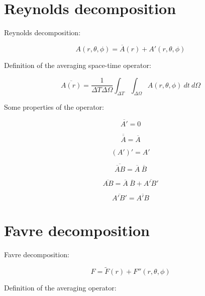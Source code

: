 \documentclass[10pt,paper=a4]{report}
\newcommand{\eht}{\overline}
\newcommand{\fht}{\widetilde}
\begin{document}
\section{Reynolds decomposition}

\noindent 
Reynolds decomposition:

\begin{equation}
A(r,\theta,\phi) = \eht{A}(r) + A'(r,\theta,\phi)
\end{equation}

\noindent
Definition of the averaging space-time operator:

\begin{equation}
\eht{A(r)} = \frac{1}{\Delta T \Delta \Omega} \int_{\Delta T}\int_{\Delta \Omega} A(r,
\theta,\phi) \ dt \ d\Omega
\end{equation}

\noindent
Some properties of the operator:

\begin{equation}
\eht{A'} = 0 
\end{equation}

\begin{equation}
\eht{\eht{A}}=\eht{A}
\end{equation}

\begin{equation}
(A')'=A'
\end{equation}

\begin{equation}
\eht{\eht{A}B} = \eht{A} \ \eht{B}
\end{equation}

\begin{equation}
\eht{AB} = \eht{A} \ \eht{B} + \eht{A'B'}
\end{equation}

\begin{equation}
\eht{A'B'} = \eht{A'B}
\end{equation}

\section{Favre decomposition}

\noindent 
Favre decomposition:

\begin{equation}
F = \fht{F}(r) + F''(r,\theta,\phi)
\end{equation}

\noindent
Definition of the averaging operator:
\end{document}

